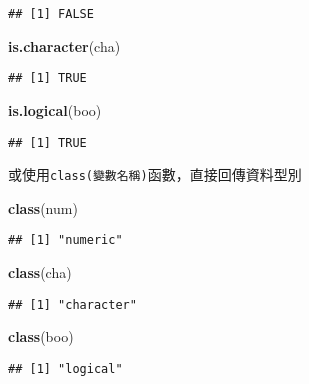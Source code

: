 \documentclass[]{book}
\newenvironment{Shaded}{\begin{snugshade}}{\end{snugshade}}
\newcommand{\KeywordTok}[1]{\textcolor[rgb]{0.13,0.29,0.53}{\textbf{{#1}}}}
\newcommand{\NormalTok}[1]{{#1}}
\begin{document}
\begin{verbatim}
## [1] FALSE
\end{verbatim}

\begin{Shaded}
\begin{Highlighting}[]
\KeywordTok{is.character}\NormalTok{(cha)}
\end{Highlighting}
\end{Shaded}

\begin{verbatim}
## [1] TRUE
\end{verbatim}

\begin{Shaded}
\begin{Highlighting}[]
\KeywordTok{is.logical}\NormalTok{(boo)}
\end{Highlighting}
\end{Shaded}

\begin{verbatim}
## [1] TRUE
\end{verbatim}

或使用\texttt{class(變數名稱)}函數，直接回傳資料型別

\begin{Shaded}
\begin{Highlighting}[]
\KeywordTok{class}\NormalTok{(num)}
\end{Highlighting}
\end{Shaded}

\begin{verbatim}
## [1] "numeric"
\end{verbatim}

\begin{Shaded}
\begin{Highlighting}[]
\KeywordTok{class}\NormalTok{(cha)}
\end{Highlighting}
\end{Shaded}

\begin{verbatim}
## [1] "character"
\end{verbatim}

\begin{Shaded}
\begin{Highlighting}[]
\KeywordTok{class}\NormalTok{(boo)}
\end{Highlighting}
\end{Shaded}

\begin{verbatim}
## [1] "logical"
\end{verbatim}
\end{document}

